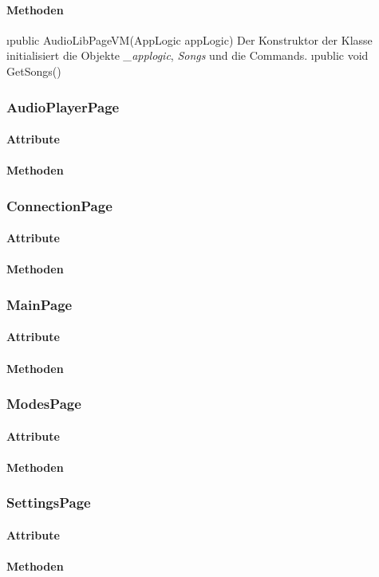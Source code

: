 \documentclass[../entwurf.tex]{subfiles}
\begin{document}
\paragraph{Methoden}
\begin{itemize}
	\i{public AudioLibPageVM(AppLogic appLogic)} Der Konstruktor der Klasse initialisiert die Objekte \textit{\_applogic}, \textit{Songs} und die Commands.
	\i{public void GetSongs()}
\end{itemize}
\subsubsection{AudioPlayerPage}
\paragraph{Attribute}
\paragraph{Methoden}
\subsubsection{ConnectionPage}
\paragraph{Attribute}
\paragraph{Methoden}
\subsubsection{MainPage}
\paragraph{Attribute}
\paragraph{Methoden}
\subsubsection{ModesPage}
\paragraph{Attribute}
\paragraph{Methoden}
\subsubsection{SettingsPage}
\paragraph{Attribute}
\paragraph{Methoden}
\end{document}
